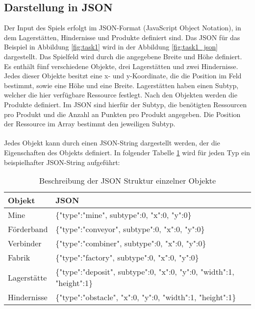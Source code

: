 \subsection{Darstellung in JSON}
Der Input des Spiels erfolgt im JSON-Format (JavaScript Object Notation), in dem Lagerstätten, Hindernisse und Produkte definiert sind. Das JSON für das Beispiel in Abbildung \ref{fig:task1} wird in der Abbildung \ref{fig:task1_json} dargestellt.
Das Spielfeld wird durch die angegebene Breite und Höhe definiert. Es enthält fünf verschiedene Objekte, drei Lagerstätten und zwei Hindernisse. Jedes dieser Objekte besitzt eine x- und y-Koordinate, die die Position im Feld bestimmt, sowie eine Höhe und eine Breite. Lagerstätten haben einen Subtyp, welcher die hier verfügbare Ressource festlegt. Nach den Objekten werden die Produkte definiert. Im JSON sind hierfür der Subtyp, die benötigten Ressourcen pro Produkt und die Anzahl an Punkten pro Produkt angegeben. Die Position der Ressource im Array bestimmt den jeweiligen Subtyp.
\\\\
Jedes Objekt kann durch einen JSON-String dargestellt werden, der die Eigenschaften des Objekts definiert. In folgender Tabelle \ref{tab:json} wird für jeden Typ ein beispielhafter JSON-String aufgeführt:

\begin{table}
	\begin{center}
		\begin{tabular}{ | l | l | } 
			\hline
			\textbf{Objekt}& \textbf{JSON}\\  \hline
			Mine & \{"type":"mine", \dq{}subtype":0, "x":0, "y":0\}\\ \hline
			Förderband & \{"type":"conveyor", \dq{}subtype":0, "x":0, "y":0\} \\ \hline
			Verbinder & \{"type":"combiner", \dq{}subtype":0, "x":0, "y":0\} \\ \hline
			Fabrik & \{"type":"factory", \dq{}subtype":0, "x":0, "y":0\}\\ \hline
			Lagerstätte & \{"type":"deposit", \dq{}subtype":0, "x":0, "y":0, "width":1, "height":1\}  \\ \hline
			Hindernisse & \{"type":"obstacle", "x":0, "y":0, "width":1, "height":1\}\\\hline
		\end{tabular}
		
		\caption{Beschreibung der JSON Struktur einzelner Objekte }\label{tab:json}
	\end{center}
\end{table}



